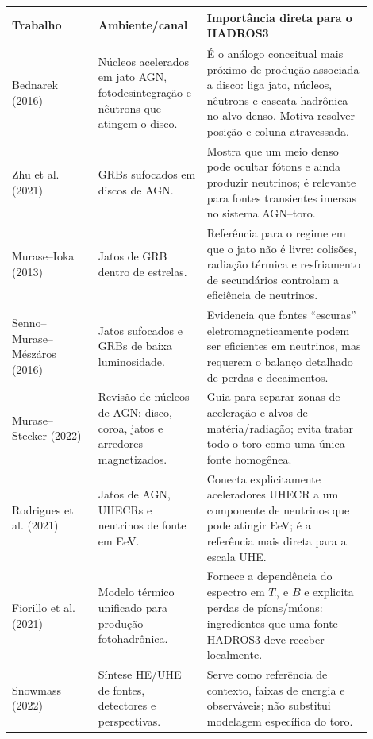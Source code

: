 \documentclass[11pt,a4paper]{article}
\begin{document}
\begin{longtable}{p{0.22\linewidth}p{0.26\linewidth}p{0.42\linewidth}}
\toprule
Trabalho & Ambiente/canal & Importância direta para o HADROS3 \\
\midrule
\endhead
Bednarek (2016)~\cite{Bednarek2016} & Núcleos acelerados em jato AGN, fotodesintegração e nêutrons que atingem o disco. & É o análogo conceitual mais próximo de produção associada a disco: liga jato, núcleos, nêutrons e cascata hadrônica no alvo denso. Motiva resolver posição e coluna atravessada. \\
Zhu et al. (2021)~\cite{Zhu2021} & GRBs sufocados em discos de AGN. & Mostra que um meio denso pode ocultar fótons e ainda produzir neutrinos; é relevante para fontes transientes imersas no sistema AGN--toro. \\
Murase--Ioka (2013)~\cite{MuraseIoka2013} & Jatos de GRB dentro de estrelas. & Referência para o regime em que o jato não é livre: colisões, radiação térmica e resfriamento de secundários controlam a eficiência de neutrinos. \\
Senno--Murase--Mészáros (2016)~\cite{Senno2016} & Jatos sufocados e GRBs de baixa luminosidade. & Evidencia que fontes ``escuras'' eletromagneticamente podem ser eficientes em neutrinos, mas requerem o balanço detalhado de perdas e decaimentos. \\
Murase--Stecker (2022)~\cite{MuraseStecker2022} & Revisão de núcleos de AGN: disco, coroa, jatos e arredores magnetizados. & Guia para separar zonas de aceleração e alvos de matéria/radiação; evita tratar todo o toro como uma única fonte homogênea. \\
Rodrigues et al. (2021)~\cite{Rodrigues2021} & Jatos de AGN, UHECRs e neutrinos de fonte em EeV. & Conecta explicitamente aceleradores UHECR a um componente de neutrinos que pode atingir EeV; é a referência mais direta para a escala UHE. \\
Fiorillo et al. (2021)~\cite{Fiorillo2021} & Modelo térmico unificado para produção fotohadrônica. & Fornece a dependência do espectro em $T_\gamma$ e $B$ e explicita perdas de píons/múons: ingredientes que uma fonte HADROS3 deve receber localmente. \\
Snowmass (2022)~\cite{Snowmass2022} & Síntese HE/UHE de fontes, detectores e perspectivas. & Serve como referência de contexto, faixas de energia e observáveis; não substitui modelagem específica do toro. \\
\bottomrule
\end{longtable}
\end{document}
